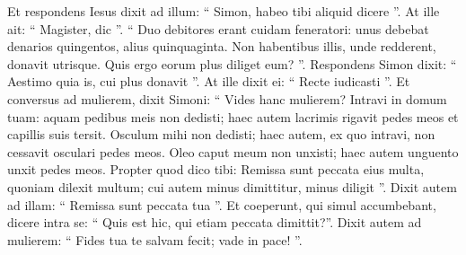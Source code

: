 \begin{biblechapter}
\begin{biblechapter}
\begin{biblechapter}
\begin{biblechapter}
\begin{biblechapter}
\begin{biblechapter}
\begin{biblechapter}
\verse Et respondens Iesus dixit ad illum: “ Simon, habeo tibi aliquid dicere ”. At ille ait: “ Magister, dic ”. 
\verse “ Duo debitores erant cuidam feneratori: unus debebat denarios quingentos, alius quinquaginta. 
\verse Non habentibus illis, unde redderent, donavit utrisque. Quis ergo eorum plus diliget eum? ”. 
\verse Respondens Simon dixit: “ Aestimo quia is, cui plus donavit ”. At ille dixit ei: “ Recte iudicasti ”. 
\verse Et conversus ad mulierem, dixit Simoni: “ Vides hanc mulierem? Intravi in domum tuam: aquam pedibus meis non dedisti; haec autem lacrimis rigavit pedes meos et capillis suis tersit. 
\verse Osculum mihi non dedisti; haec autem, ex quo intravi, non cessavit osculari pedes meos. 
\verse Oleo caput meum non unxisti; haec autem unguento unxit pedes meos. 
\verse Propter quod dico tibi: Remissa sunt peccata eius multa, quoniam dilexit multum; cui autem minus dimittitur, minus diligit ”. 
 \verse Dixit autem ad illam: “ Remissa sunt peccata tua ”. 
\verse Et coeperunt, qui simul accumbebant, dicere intra se: “ Quis est hic, qui etiam peccata dimittit?”. 
\verse Dixit autem ad mulierem: “ Fides tua te salvam fecit; vade in pace! ”.
 

\end{biblechapter}
\end{biblechapter}
\end{biblechapter}
\end{biblechapter}
\end{biblechapter}
\end{biblechapter}
\end{biblechapter}
